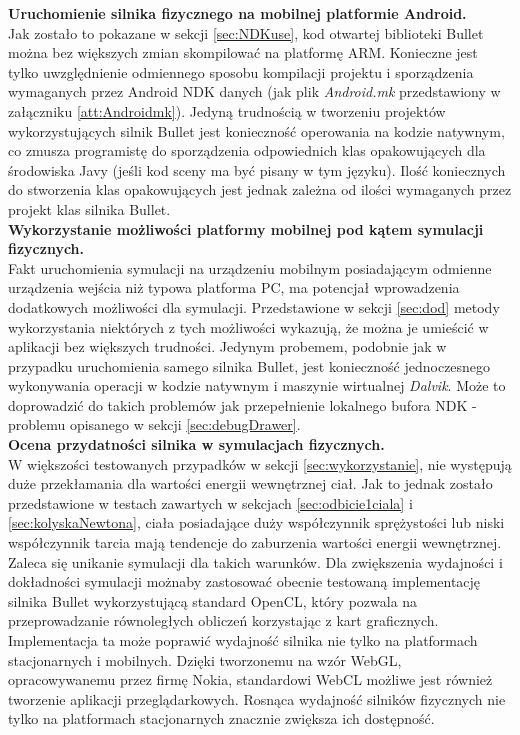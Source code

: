 \textbf{Uruchomienie silnika fizycznego na mobilnej platformie Android.}\\
Jak zostało to pokazane w sekcji \ref{sec:NDKuse}, kod otwartej biblioteki
Bullet można bez większych zmian skompilować na platformę ARM. Konieczne jest
tylko uwzględnienie odmiennego sposobu kompilacji projektu i sporządzenia
wymaganych przez Android NDK danych (jak plik \emph{Android.mk} przedstawiony w
załączniku \ref{att:Androidmk}). Jedyną trudnością w tworzeniu projektów
wykorzystujących silnik Bullet jest konieczność operowania na kodzie natywnym,
co zmusza programistę do sporządzenia odpowiednich klas opakowujących dla
środowiska Javy (jeśli kod sceny ma być pisany w tym języku). Ilość koniecznych
do stworzenia klas opakowujących jest jednak zależna od ilości wymaganych
przez projekt klas silnika Bullet.\\

\textbf{Wykorzystanie możliwości platformy mobilnej pod kątem symulacji
fizycznych.}\\
Fakt uruchomienia symulacji na urządzeniu mobilnym posiadającym odmienne
urządzenia wejścia niż typowa platforma PC, ma potencjał wprowadzenia
dodatkowych możliwości dla symulacji. Przedstawione w sekcji \ref{sec:dod}
metody wykorzystania niektórych z tych możliwości wykazują, że można je umieścić
w aplikacji bez większych trudności. Jedynym probemem, podobnie jak w przypadku
uruchomienia samego silnika Bullet, jest konieczność jednoczesnego wykonywania
operacji w kodzie natywnym i maszynie wirtualnej \emph{Dalvik}. Może to
doprowadzić do takich problemów jak przepełnienie lokalnego bufora NDK -
problemu opisanego w sekcji \ref{sec:debugDrawer}.\\
\newpage
\textbf{Ocena przydatności silnika w symulacjach fizycznych.}\\
W większości testowanych przypadków w sekcji \ref{sec:wykorzystanie}, nie
występują duże przekłamania dla wartości energii wewnętrznej ciał. Jak to jednak
zostało przedstawione w testach zawartych w sekcjach \ref{sec:odbicie1ciala} i
\ref{sec:kolyskaNewtona}, ciała posiadające duży współczynnik sprężystości lub
niski współczynnik tarcia mają tendencje do zaburzenia wartości energii
wewnętrznej. Zaleca się unikanie symulacji dla takich warunków. Dla zwiększenia
wydajności i dokładności symulacji możnaby zastosować obecnie testowaną
implementację silnika Bullet wykorzystującą standard OpenCL, który pozwala na
przeprowadzanie równoległych obliczeń korzystając z kart graficznych.
Implementacja ta może poprawić wydajność silnika nie tylko na platformach
stacjonarnych i mobilnych. Dzięki tworzonemu na wzór WebGL, opracowywanemu przez
firmę Nokia, standardowi WebCL możliwe jest również tworzenie aplikacji
przeglądarkowych. Rosnąca wydajność silników fizycznych nie tylko na platformach
stacjonarnych znacznie zwiększa ich dostępność.